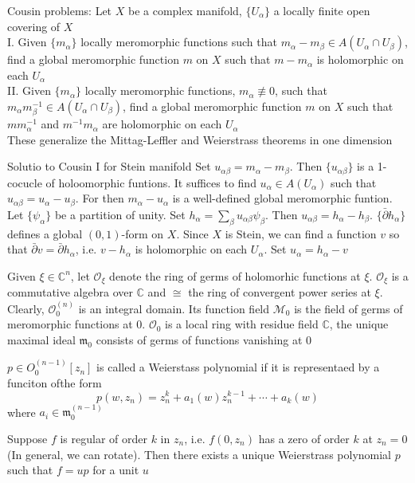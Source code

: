 \documentclass[../main.tex]{subfiles}
\begin{document}
Cousin problems: Let $X$ be a complex manifold, $\{U_\alpha\}$ a locally finite open covering of $X$ \\
I. Given $\{m_\alpha\}$ locally meromorphic functions such that $m_\alpha-m_\beta\in A(U_\alpha\cap U_\beta)$, find a global meromorphic function $m$ on $X$ such that $m-m_\alpha$ is holomorphic on each $U_\alpha$ \\
II. Given $\{m_\alpha\}$ locally meromorphic functions, $m_\alpha\not\equiv0$, such that $m_\alpha m_\beta^{-1}\in A(U_\alpha\cap U_\beta)$, find a global meromorphic function $m$ on $X$ such that $mm_\alpha^{-1}$ and $m^{-1}m_\alpha$ are holomorphic on each $U_\alpha$ \\
These generalize the Mittag-Leffler and Weierstrass theorems in one dimension

Solutio to Cousin I for Stein manifold
Set $u_{\alpha\beta}=m_\alpha-m_\beta$. Then $\{u_{\alpha\beta}\}$ is a 1-cocucle of holoomorphic funtions. It suffices to find $u_\alpha\in A(U_\alpha)$ such that $u_{\alpha\beta}=u_\alpha-u_\beta$. For then $m_\alpha-u_\alpha$ is a well-defined global meromorphic funtion. Let $\{\psi_\alpha\}$ be a partition of unity. Set $h_\alpha=\sum_\beta u_{\alpha\beta}\psi_\beta$. Then $u_{\alpha\beta}=h_\alpha-h_\beta$. $\{\bar\partial h_\alpha\}$ defines a global $(0,1)$-form on $X$. Since $X$ is Stein, we can find a function $v$ so that $\bar\partial v=\bar\partial h_\alpha$, i.e. $v-h_\alpha$ is holomorphic on each $U_\alpha$. Set $u_\alpha=h_\alpha-v$

\begin{definition}
Given $\xi\in\mathbb C^n$, let $\mathcal O_\xi$ denote the ring of germs of holomorhic functions at $\xi$. $\mathcal O_\xi$ is a commutative algebra over $\mathbb C$ and $\cong$ the ring of convergent power series at $\xi$. Clearly, $\mathcal O^{(n)}_0$ is an integral domain. Its function field $\mathcal M_0$ is the field of germs of meromorphic functions at $0$. $\mathcal O_0$ is a local ring with residue field $\mathbb C$, the unique maximal ideal $\mathfrak m_0$ consists of germs of functions vanishing at $0$
\end{definition}

\begin{definition}
$p\in O^{(n-1)}_0[z_n]$ is called a Weierstass polynomial if it is representaed by a funciton ofthe form
\[p(w,z_n)=z_n^k+a_1(w)z_n^{k-1}+\cdots+a_k(w)\]
where $a_i\in \mathfrak m_0^{(n-1)}$
\end{definition}

\begin{theorem}
Suppose $f$ is regular of order $k$ in $z_n$, i.e. $f(0,z_n)$ has a zero of order $k$ at $z_n=0$ (In general, we can rotate). Then there exists a unique Weierstrass polynomial $p$ such that $f=up$ for a unit $u$
\end{theorem}
\end{document}
